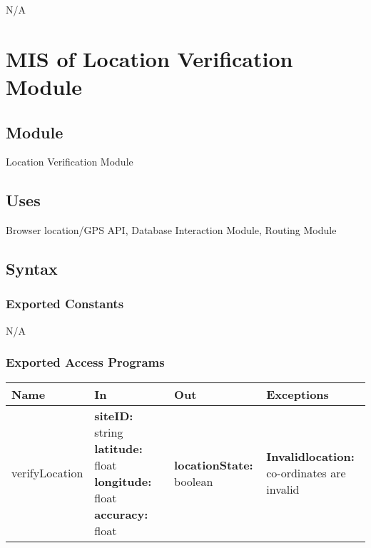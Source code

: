 \documentclass[12pt, titlepage]{article}
\begin{document}
N/A

\section{MIS of Location Verification Module} \label{Module}

\subsection{Module}

Location Verification Module

\subsection{Uses}

Browser location/GPS API, Database Interaction Module, Routing Module

\subsection{Syntax}

\subsubsection{Exported Constants}

N/A

\subsubsection{Exported Access Programs}

\begin{center}
  \begin{tabular}{>{\raggedright}p{2.75cm} >{\raggedright}p{3.25cm}
    >{\raggedright}p{4.5cm} p{5cm}}
    \hline
    \textbf{Name} & \textbf{In} & \textbf{Out} & \textbf{Exceptions} \\
    \hline
    verifyLocation & \textbf{siteID:} string \newline
    \textbf{latitude:} float \newline
    \textbf{longitude:} float \newline \textbf{accuracy:} float &
    \textbf{locationState:} boolean &
    \textbf{Invalidlocation:} co-ordinates are invalid \\
    \hline
  \end{tabular}
\end{center}
\end{document}
